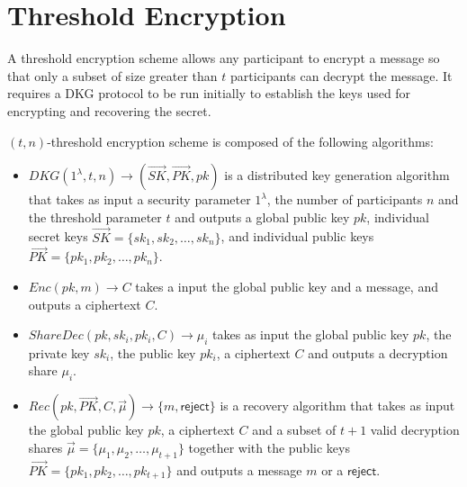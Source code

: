 \documentclass[letterpaper,twocolumn,10pt]{article}
\theoremstyle{definition}
\theoremstyle{remark}
\begin{document}
\section{Threshold Encryption}
\label{appendix:thresholdEnc}
A threshold encryption scheme allows any participant to encrypt a message so that only a subset of size greater than $t$ participants can decrypt the message. It requires a DKG protocol to be run initially to establish the keys used for encrypting and recovering the secret.

$(t, n)$-threshold encryption scheme is composed of the following algorithms:
\begin{itemize}
    \item $DKG(1^\lambda, t, n) \rightarrow (\vec{SK}, \vec{PK}, pk)$ is a distributed key generation algorithm that takes as input a security parameter $1^\lambda$, the number of participants $n$ and the threshold parameter $t$ and outputs a global public key $pk$, individual secret keys $\vec{SK} = \{sk_1, sk_2, \ldots, sk_n\}$, and individual public keys $\vec{PK} = \{pk_1, pk_2, \ldots,pk_n\}$.
    \item $Enc(pk, m) \rightarrow C$ takes a input the global public key and a message, and outputs a ciphertext $C$.
    \item $ShareDec(pk, sk_i, pk_i, C) \rightarrow \mu_i$ takes as input the global public key $pk$, the private key $sk_i$, the public key $pk_i$, a ciphertext $C$ and outputs a decryption share $\mu_i$.
    \item $Rec(pk, \vec{PK}, C, \vec{\mu} )\rightarrow \{m, \mathsf{reject}\}$ is a recovery algorithm that takes as input the global public key $pk$, a ciphertext $C$ and a subset of $t+1$ valid decryption shares $\vec{\mu} = \{\mu_1, \mu_2,\ldots, \mu_{t+1}\}$ together with the public keys $\vec{PK} = \{pk_1, pk_2,\ldots, pk_{t+1}\}$ and outputs a message $m$ or a $\mathsf{reject}$.
\end{itemize}
\end{document}
